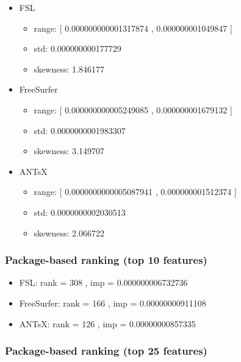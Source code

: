 \documentclass[
  10pt,
]{article}
\begin{document}
\begin{itemize}
\item
  FSL

  \begin{itemize}
  \item
    range: {[} 0.000000000001317874 , 0.000000001049847 {]}
  \item
    std: 0.000000000177729
  \item
    skewness: 1.846177
  \end{itemize}
\item
  FreeSurfer

  \begin{itemize}
  \item
    range: {[} 0.000000000005249085 , 0.000000001679132 {]}
  \item
    std: 0.0000000001983307
  \item
    skewness: 3.149707
  \end{itemize}
\item
  ANTsX

  \begin{itemize}
  \item
    range: {[} 0.0000000000005087941 , 0.000000001512374 {]}
  \item
    std: 0.0000000002030513
  \item
    skewness: 2.066722
  \end{itemize}
\end{itemize}

\hypertarget{package-based-ranking-top-10-features-11}{%
\subsubsection{Package-based ranking (top 10
features)}\label{package-based-ranking-top-10-features-11}}

\begin{itemize}
\item
  FSL: rank = 308 , imp = 0.000000006732736
\item
  FreeSurfer: rank = 166 , imp = 0.00000000911108
\item
  ANTsX: rank = 126 , imp = 0.00000000857335
\end{itemize}

\hypertarget{package-based-ranking-top-25-features-11}{%
\subsubsection{Package-based ranking (top 25
features)}\label{package-based-ranking-top-25-features-11}}
\end{document}
